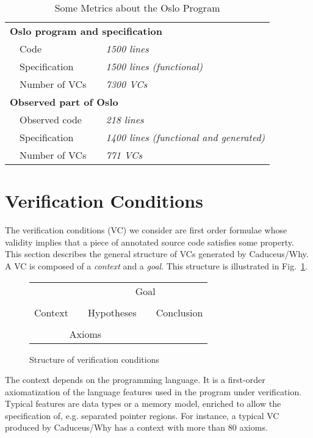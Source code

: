 \documentclass{acm_proc_article-sp}
\theoremstyle{nonumberplain}
\begin{document}
\begin{table}[bht!]

    \begin{tabular}{@{~}l@{~~}l@{~}l@{~}l@{}}
      \multicolumn{4}{l}{\bf Oslo program and specification}\\
      &Code          &&\it 1500 lines \\
      &Specification &&\it 1500 lines (functional)\\
      &Number of VCs &&\it 7300 VCs\\
      \multicolumn{4}{l}{\bf Observed part of Oslo}\\
      &Observed code &&\it       218 lines\\
      &Specification &&\it 1400 lines (functional and generated)\\ 
      &Number of VCs &&\it       771 VCs\\
    \end{tabular}

  \caption{Some Metrics about the Oslo Program}
  \label{tab:oslo}
\end{table}

\section{Verification Conditions}\label{sec:vcnf}
The verification conditions (VC) we consider are first order formulae
whose validity implies that a piece of annotated source code satisfies
some property. This section describes the general structure of VCs
generated by Cadu\-ceus/Why. A VC is composed of a \emph{context} and a
\emph{goal}. This structure is illustrated in Fig.~\ref{fig:vc}.


\begin{figure}[hbt!]
\begin{center}
\begin{tabular}{ccccc}
&  & \multicolumn{3}{c}{Goal} \\
&  & \multicolumn{3}{c}{} \\
Context &  & Hypotheses &  & Conclusion \\
\multicolumn{3}{c}{} \\ \multicolumn{3}{c}{Axioms}
\end{tabular}
\end{center}
\caption{Structure of verification conditions \label{fig:vc}}
\end{figure}
The context depends on the programming language. It is a first-order
axiomatization of the language features used in the program under
verification. Typical features are data types or a memory model,
enriched to allow the specification of, e.g. separated pointer regions.
For instance, a typical VC produced by Caduceus/Why has a context with
more than 80 axioms.
\end{document}
